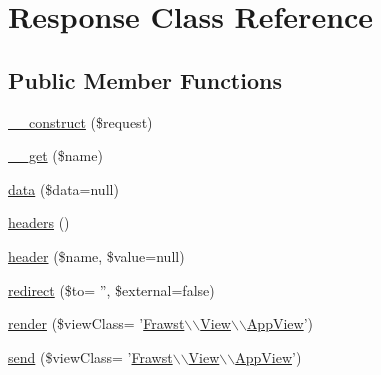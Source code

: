 \hypertarget{classResponse}{
\section{Response Class Reference}
\label{classResponse}
}
\subsection*{Public Member Functions}
\begin{DoxyCompactItemize}
\item 
\hyperlink{classResponse_a0b56fd29658dadcf8b08be1912a59c0e}{\_\-\_\-construct} (\$request)
\item 
\hyperlink{classResponse_a784441c53f2d035af9cf8736006aa914}{\_\-\_\-get} (\$name)
\item 
\hyperlink{classResponse_ac4311e7d9dcec3bcdb0d55807303e7c1}{data} (\$data=null)
\item 
\hyperlink{classResponse_a007132b026abc70f7085d153c2359969}{headers} ()
\item 
\hyperlink{classResponse_ae29e05652ee532c0e1fe33f1ea91b679}{header} (\$name, \$value=null)
\item 
\hyperlink{classResponse_ab821b9432e79a01873aebee827876f8e}{redirect} (\$to= '', \$external=false)
\item 
\hyperlink{classResponse_afe4adc06ad1212cdea51f1312ad58249}{render} (\$viewClass= '\hyperlink{classFrawst}{Frawst}$\backslash$$\backslash$\hyperlink{classView}{View}$\backslash$$\backslash$\hyperlink{classAppView}{AppView}')
\item 
\hyperlink{classResponse_ab15393b225938861debc57f2fce6481e}{send} (\$viewClass= '\hyperlink{classFrawst}{Frawst}$\backslash$$\backslash$\hyperlink{classView}{View}$\backslash$$\backslash$\hyperlink{classAppView}{AppView}')
\end{DoxyCompactItemize}
